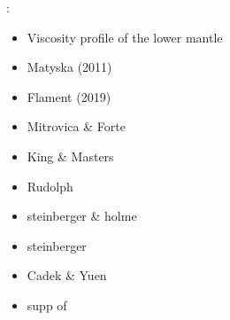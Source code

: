 \Literature:
\begin{itemize} 
\item Viscosity profile of the lower mantle \cite{elss85}
\item Matyska \etal (2011) \cite{mayw11}
\item Flament (2019) \cite{flam19}
\item Mitrovica \& Forte \cite{mifo04}
\item King \& Masters \cite{kima92}
\item Rudolph \etal \cite{rull15}
\item steinberger \& holme \cite{stho08}
\item steinberger \cite{stei16}
\item Cadek \& Yuen \cite{cayu93}
\item supp of \cite{badw17}
\end{itemize} 
